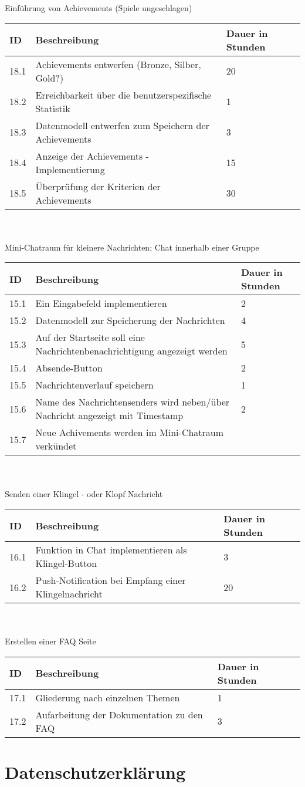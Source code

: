 Einführung von Achievements (Spiele ungeschlagen)\\
\begin{tabular}[h]{|p{1cm}|p{10cm}|p{3cm}|}
\hline 
ID & Beschreibung & Dauer in Stunden \\ \hline
18.1 & Achievements entwerfen (Bronze, Silber, Gold?) & 20 \\ \hline
18.2 & Erreichbarkeit über die benutzerspezifische Statistik & 1 \\ \hline
18.3 & Datenmodell entwerfen zum Speichern der Achievements & 3 \\ \hline
18.4 & Anzeige der Achievements - Implementierung & 15 \\ \hline
18.5 & Überprüfung der Kriterien der Achievements & 30 \\ \hline
\end{tabular}\\ \\
Mini-Chatraum für kleinere Nachrichten; Chat innerhalb einer Gruppe\\
\begin{tabular}[h]{|p{1cm}|p{10cm}|p{3cm}|}
\hline 
ID & Beschreibung & Dauer in Stunden \\ \hline
15.1 & Ein Eingabefeld implementieren & 2 \\ \hline
15.2 & Datenmodell zur Speicherung der Nachrichten & 4 \\ \hline
15.3 & Auf der Startseite soll eine Nachrichtenbenachrichtigung angezeigt werden & 5 \\ \hline
15.4 & Absende-Button & 2 \\ \hline
15.5 & Nachrichtenverlauf speichern & 1 \\ \hline
15.6 & Name des Nachrichtensenders wird neben/über Nachricht angezeigt mit Timestamp & 2 \\ \hline
15.7 & Neue Achivements werden im Mini-Chatraum verkündet & \\ \hline
\end{tabular}\\ \\
Senden einer Klingel - oder Klopf Nachricht\\
\begin{tabular}[h]{|p{1cm}|p{10cm}|p{3cm}|}
\hline 
ID & Beschreibung & Dauer in Stunden \\ \hline
16.1 & Funktion in Chat implementieren als Klingel-Button & 3 \\ \hline
16.2 & Push-Notification bei Empfang einer Klingelnachricht & 20 \\ \hline
\end{tabular}\\ \\
Erstellen einer FAQ Seite\\
\begin{tabular}[h]{|p{1cm}|p{10cm}|p{3cm}|}
\hline 
ID & Beschreibung & Dauer in Stunden \\ \hline
17.1 & Gliederung nach einzelnen Themen & 1	\\ \hline
17.2 & Aufarbeitung der Dokumentation zu den FAQ & 3 \\ \hline
\end{tabular}
\section*{Datenschutzerklärung}

	